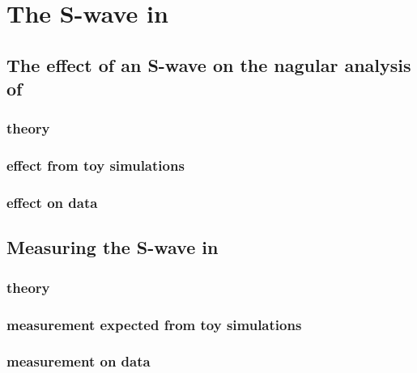 \chapter{The S-wave in \BdToKpimm}

\section{The effect of an S-wave on the nagular analysis of \BdToKstmm}

\subsection{theory}

\subsection{effect from toy simulations}

\subsection{effect on data}

\section{Measuring the S-wave in \BdToKpimm}

\subsection{theory}

\subsection{measurement expected from toy simulations}

\subsection{measurement on data}
